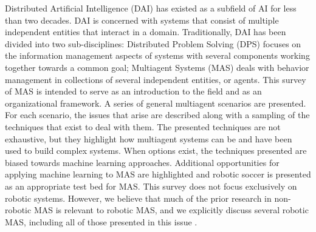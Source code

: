 Distributed Artificial Intelligence (DAI) has existed as a subfield of AI for less than two decades. DAI is concerned with systems that consist of multiple independent entities that interact in a domain. Traditionally, DAI has been divided into two sub-disciplines: Distributed Problem Solving (DPS) focuses on the information management aspects of systems with several components working together towards a common goal; Multiagent Systems (MAS) deals with behavior management in collections of several independent entities, or agents. This survey of MAS is intended to serve as an introduction to the field and as an organizational framework. A series of general multiagent scenarios are presented. For each scenario, the issues that arise are described along with a sampling of the techniques that exist to deal with them. The presented techniques are not exhaustive, but they highlight how multiagent systems can be and have been used to build complex systems. When options exist, the techniques presented are biased towards machine learning approaches. Additional opportunities for applying machine learning to MAS are highlighted and robotic soccer is presented as an appropriate test bed for MAS. This survey does not focus exclusively on robotic systems. However, we believe that much of the prior research in non-robotic MAS is relevant to robotic MAS, and we explicitly discuss several robotic MAS, including all of those presented in this issue \cite{ref:stone2000multiagent}.